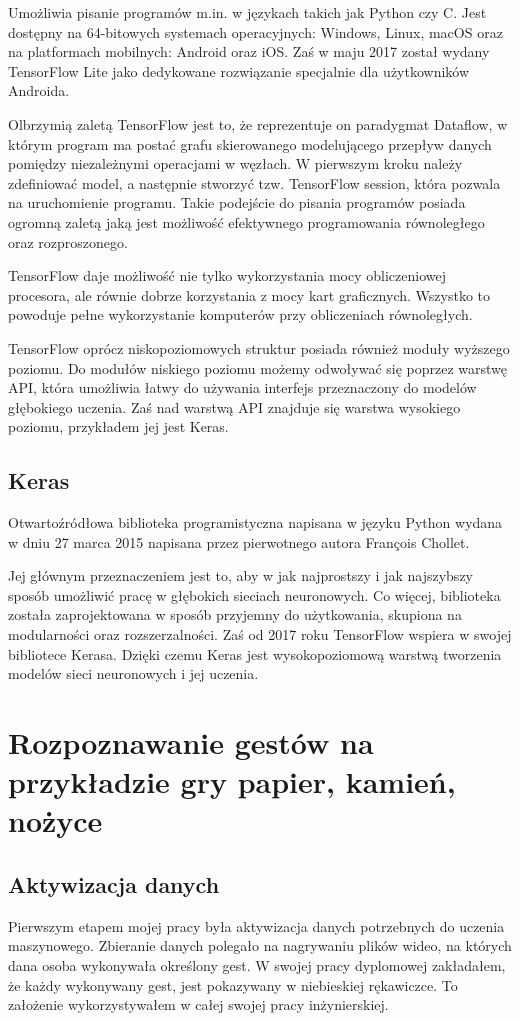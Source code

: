 \documentclass[a4paper,12pt,twoside,openany]{report}
\begin{document}
Umożliwia pisanie programów m.in. w językach takich jak Python czy C. Jest dostępny na 64-bitowych systemach operacyjnych: Windows, Linux, macOS oraz na platformach mobilnych: Android oraz iOS. Zaś w maju 2017 został wydany TensorFlow Lite jako dedykowane rozwiązanie specjalnie dla użytkowników Androida.

Olbrzymią zaletą TensorFlow jest to, że reprezentuje on paradygmat Dataflow, w którym program ma postać grafu skierowanego modelującego przepływ danych pomiędzy niezależnymi operacjami w węzłach. W pierwszym kroku należy zdefiniować model, a następnie stworzyć tzw. TensorFlow session, która pozwala na uruchomienie programu. Takie podejście do pisania programów posiada ogromną zaletą jaką jest możliwość efektywnego programowania równoległego oraz rozproszonego. 

TensorFlow daje możliwość nie tylko wykorzystania mocy obliczeniowej procesora, ale równie dobrze korzystania z mocy kart graficznych. Wszystko to powoduje pełne wykorzystanie komputerów przy obliczeniach równoległych.

TensorFlow oprócz niskopoziomowych struktur posiada również moduły wyższego poziomu. Do modułów niskiego poziomu możemy odwoływać się poprzez warstwę API, która umożliwia łatwy do używania interfejs przeznaczony do modelów głębokiego uczenia. Zaś nad warstwą API znajduje się warstwa wysokiego poziomu, przykładem jej jest Keras.

\section{Keras}
Otwartoźródłowa biblioteka programistyczna napisana w języku Python wydana w dniu 27 marca 2015 napisana przez pierwotnego autora François Chollet. 

Jej głównym przeznaczeniem jest to, aby w jak najprostszy i  jak najszybszy sposób umożliwić pracę w głębokich sieciach neuronowych. Co więcej, biblioteka została zaprojektowana w sposób przyjemny do użytkowania, skupiona na modularności oraz rozszerzalności. Zaś od 2017 roku TensorFlow wspiera w swojej bibliotece Kerasa. Dzięki czemu Keras jest wysokopoziomową warstwą tworzenia modelów sieci neuronowych i jej uczenia.

\chapter{Rozpoznawanie gestów na przykładzie gry papier, kamień, nożyce}
\section{Aktywizacja danych}
Pierwszym etapem mojej pracy była aktywizacja danych potrzebnych do uczenia maszynowego. Zbieranie danych polegało na nagrywaniu plików wideo, na których dana osoba wykonywała określony gest. W swojej pracy dyplomowej zakładałem, że każdy wykonywany gest, jest pokazywany w niebieskiej rękawiczce. To założenie wykorzystywałem w całej swojej pracy inżynierskiej.
\end{document}
